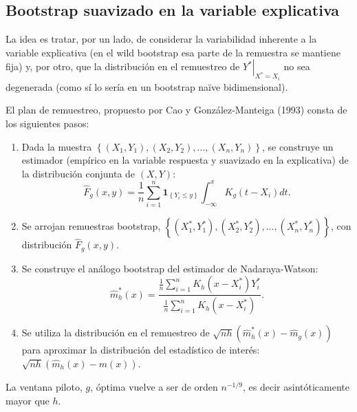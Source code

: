 \documentclass[
]{book}
\theoremstyle{break}
\theoremstyle{definition}
\theoremstyle{definition}
\theoremstyle{definition}
\theoremstyle{remark}
\begin{document}
\hypertarget{bootstrap-suavizado-en-la-variable-explicativa}{%
\subsection{Bootstrap suavizado en la variable explicativa}\label{bootstrap-suavizado-en-la-variable-explicativa}}

La idea es tratar, por un lado, de considerar la variabilidad inherente
a la variable explicativa (en el wild bootstrap esa parte de la
remuestra se mantiene fija) y, por otro, que la distribución en el
remuestreo de \(\left. Y^{\ast}\right\vert _{X^{\ast}=X_i}\) no sea
degenerada (como sí lo sería en un bootstrap naïve bidimensional).

El plan de remuestreo, propuesto por Cao y González-Manteiga (1993)
consta de los siguientes pasos:

\begin{enumerate}
\def\labelenumi{\arabic{enumi}.}
\item
  Dada la muestra \(\left\{ \left( X_1,Y_1 \right),\left( X_2,Y_2 \right),\ldots ,\left( X_n,Y_n \right) \right\}\), se
  construye un estimador (empírico en la variable respuesta y
  suavizado en la explicativa) de la distribución conjunta de
  \(\left( X,Y \right)\):
  \[\hat{F}_{g}\left( x,y \right) =\frac{1}{n}\sum_{i=1}^{n}\mathbf{1}_{\left\{
  Y_i\leq y\right\} }\int_{-\infty }^{x}K_{g}\left( t-X_i \right) dt.\]
\item
  Se arrojan remuestras bootstrap, \(\left\{ \left( X_1^{\ast },Y_1^{\ast} \right),\left( X_2^{\ast},Y_2^{\ast} \right),\ldots ,\left( X_n^{\ast},Y_n^{\ast} \right) \right\}\), con
  distribución
  \(\hat{F}_{g}\left( x,y \right)\).
\item
  Se construye el análogo bootstrap del estimador de Nadaraya-Watson:
  \[\hat{m}_{h}^{\ast}\left( x \right) =\frac{\frac{1}{n}\sum_{i=1}^{n}K_{h}
  \left( x-X_i^{\ast} \right) Y_i^{\ast}}{\frac{1}{n}\sum_{i=1}^{n}K_{h}
  \left( x-X_i^{\ast} \right)}.\]
\item
  Se utiliza la distribución en el remuestreo de \(\sqrt{nh}\left( \hat{m}_{h}^{\ast}\left( x \right) -\hat{m}_{g}\left( x \right) \right)\)
  para aproximar la distribución del estadístico de interés:
  \(\sqrt{nh}\left( \hat{m}_{h}\left( x \right) -m\left( x \right) \right)\).
\end{enumerate}

La ventana piloto, \(g\), óptima vuelve a ser de orden \(n^{-1/9}\), es
decir asintóticamente mayor que \(h\).
\end{document}
